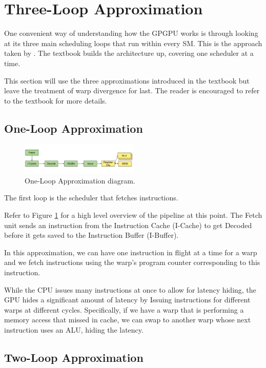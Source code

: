\section{Three-Loop Approximation}

One convenient way of understanding how the GPGPU works is through
looking at its three main scheduling loops that run within every SM.
This is the approach taken by \cite{aamodt2018general}.
The textbook builds the architecture up, covering one scheduler at a time.

This section will use the three approximations introduced in the textbook but
leave the treatment of warp divergence for last. The reader is encouraged to
refer to the textbook for more details.

\subsection{One-Loop Approximation}

\begin{figure}[h]
    \centering
    \includegraphics[width=0.5\textwidth]{assets/1.png}
    \caption{One-Loop Approximation diagram. }
    \label{fig:oneloop}
\end{figure}

The first loop is the scheduler that fetches instructions. 

Refer to Figure \ref{fig:oneloop} for a high level overview of the pipeline at this point.
The Fetch unit sends an instruction from the Instruction Cache (I-Cache) to
get Decoded before it gets saved to the Instruction Buffer (I-Buffer).

In this approximation, we can have one instruction in flight at a time for
a warp and we fetch instructions using the warp's program counter corresponding
to this instruction.

While the CPU issues many instructions at once to allow for latency
hiding, the GPU hides a significant amount of latency by Issuing
instructions for different warps at different cycles. Specifically, if we have
a warp that is performing a memory access that missed in cache, we can swap
to another warp whose next instruction uses an ALU, hiding the latency.

\subsection{Two-Loop Approximation}

